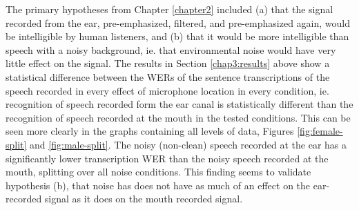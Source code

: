 

The primary hypotheses from Chapter \ref{chapter2} included (a) that the signal recorded from the ear, pre-emphasized, filtered, and pre-emphasized again, would be intelligible by human listeners, and (b) that it would be more intelligible than speech with a noisy background, ie. that environmental noise would have very little effect on the signal.  The results in Section \ref{chap3:results} above show a statistical difference between the WERs of the sentence transcriptions of the speech recorded in every \DIFdelbegin {}\DIFdelend \DIFaddbegin {}\DIFaddend effect of microphone location in every condition, ie. recognition of speech recorded form the ear canal is statistically different than the recognition of speech recorded at the mouth in the tested conditions.  This can be seen more clearly in the graphs containing all levels of data, Figures \ref{fig:female-split} and \ref{fig:male-split}.  The noisy (non-clean) speech recorded at the ear has a significantly lower transcription WER than the noisy speech recorded at the mouth, splitting over all noise conditions.  This finding seems to validate hypothesis (b), that noise has does not have as much of an effect on the ear-recorded signal as it does on the mouth recorded signal.

